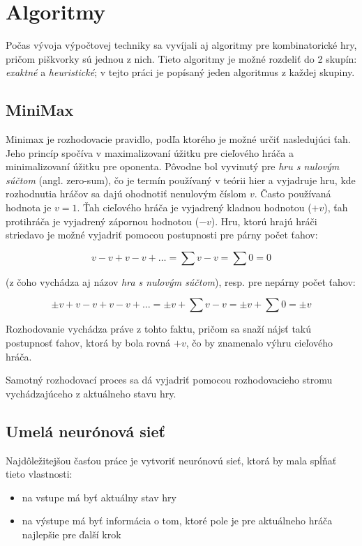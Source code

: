 \section{Algoritmy}\label{sec:algorithms}

Počas vývoja výpočtovej techniky sa vyvíjali aj algoritmy pre kombinatorické hry, pričom piškvorky sú jednou z nich.
Tieto algoritmy je možné rozdeliť do 2 skupín: \emph{exaktné} a \emph{heuristické}; v tejto práci je popísaný jeden
algoritmus z každej skupiny.

\subsection{MiniMax}\label{subsec:algo-minmax}

Minimax je rozhodovacie pravidlo, podľa ktorého je možné určiť nasledujúci ťah.
Jeho princíp spočíva v maximalizovaní úžitku pre cieľového hráča a minimalizovaní úžitku pre oponenta.
Pôvodne bol vyvinutý pre \emph{hru s nulovým súčtom} (angl. zero-sum), čo je termín používaný v teórii hier a vyjadruje hru, kde
rozhodnutia hráčov sa dajú ohodnotiť nenulovým číslom $v$.
Často používaná hodnota je $v=1$.
Ťah cieľového hráča je vyjadrený kladnou hodnotou ($+v$), ťah protihráča je vyjadrený zápornou hodnotou ($-v$).
Hru, ktorú hrajú hráči striedavo je možné vyjadriť pomocou postupnosti pre párny počet ťahov:

\begin{equation}
    v-v+v-v+ \dots = \sum{v-v} = \sum{0} = 0
\end{equation}

(z čoho vychádza aj názov \emph{hra s nulovým súčtom}), resp. pre nepárny počet ťahov:

\begin{equation}
    \pm v+v-v+v-v+ \dots = \pm v+\sum{v-v} = \pm v+\sum{0} = \pm v
\end{equation}

Rozhodovanie vychádza práve z tohto faktu, pričom sa snaží nájsť takú postupnosť ťahov, ktorá by bola rovná $+v$, čo
by znamenalo výhru cieľového hráča.

Samotný rozhodovací proces sa dá vyjadriť pomocou rozhodovacieho stromu vychádzajúceho z aktuálneho stavu hry.

\subsection{Umelá neurónová sieť}\label{subsec:algo-ann}

Najdôležitejšou časťou práce je vytvoriť neurónovú sieť, ktorá by mala spĺňať tieto vlastnosti:
\begin{itemize}
    \item na vstupe má byť aktuálny stav hry
    \item na výstupe má byť informácia o tom, ktoré pole je pre aktuálneho hráča najlepšie pre ďalší krok
\end{itemize}

